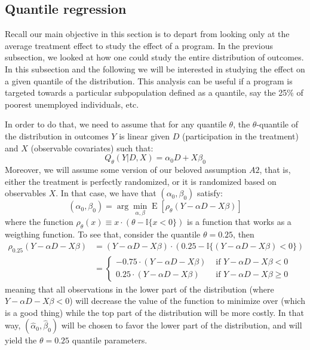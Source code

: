 \documentclass[12pt]{report}
\newcommand{\E}[1]{\operatorname{E}\left[#1\right]}
\begin{document}
\subsection{Quantile regression}

Recall our main objective in this section is to depart from looking only at the average treatment effect to study the effect of a program. In the previous subsection, we looked at how one could study the entire distribution of outcomes. In this subsection and the following we will be interested in studying the effect on a given quantile of the distribution. This analysis can be useful if a program is targeted towards a particular subpopulation defined as a quantile, say the 25\% of poorest unemployed individuals, etc.

In order to do that, we need to assume that for any quantile $\theta$, the $\theta$-quantile of the distribution in outcomes $Y$ is linear given $D$ (participation in the treatment) and $X$ (observable covariates) such that: $$ Q_\theta (Y\vert D, X) = \alpha_0D + X\beta_0 $$ Moreover, we will assume some version of our beloved assumption $A2$, that is, either the treatment is perfectly randomized, or it is randomized based on observables $X$. In that case, we have that $(\alpha_0, \beta_0)$ satisfy: $$(\alpha_0, \beta_0) = \arg\min_{\alpha, \beta} \E{\rho_\theta(Y - \alpha D - X\beta)} $$ where the function $\rho_\theta(x) \equiv x\cdot (\theta - \mathbb{I}\{x < 0\})$ is a function that works as a weigthing function. To see that, consider the quantile $\theta = 0.25$, then \begin{align*}
\rho_{0.25}(Y - \alpha D - X\beta) & = (Y - \alpha D - X\beta)\cdot (0.25 - \mathbb{I}\{(Y - \alpha D - X\beta) < 0\}) \\ & = \begin{cases}
- 0.75 \cdot (Y - \alpha D - X\beta) & \text{ if } Y - \alpha D - X\beta < 0 \\
 0.25 \cdot (Y - \alpha D - X\beta) & \text{ if } Y - \alpha D - X\beta \geq 0
\end{cases}
\end{align*}
meaning that all observations in the lower part of the distribution (where $Y - \alpha D - X\beta < 0$) will decrease the value of the function to minimize over (which is a good thing) while the top part of the distribution will be more costly. In that way, $(\hat\alpha_0, \hat\beta_0)$ will be chosen to favor the lower part of the distribution, and will yield the $\theta = 0.25$ quantile parameters.
\end{document}
